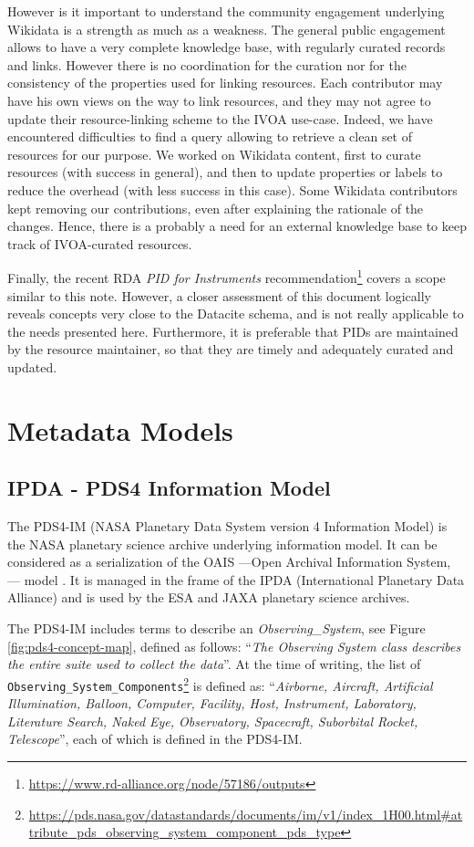 \documentclass[11pt,a4paper]{ivoa}
\begin{document}
However is it important to understand the community engagement 
underlying Wikidata is a strength as much as a weakness. The 
general public engagement allows to have a very complete  
knowledge base, with regularly curated records and links. However
there is no coordination for the curation nor for the consistency
of the properties used for linking resources. Each contributor may
have his own views on the way to link resources, and they may not 
agree to update their resource-linking scheme to the IVOA use-case.
Indeed, we have encountered difficulties to find a query allowing 
to retrieve a clean set of resources for our purpose. We worked on 
Wikidata content, first to curate resources (with success in general), 
and then to update properties or labels to reduce the overhead (with
less success in this case). Some Wikidata contributors kept removing 
our contributions, even after explaining the rationale of the changes. 
Hence, there is a probably a need for an external knowledge base to 
keep track of IVOA-curated resources.  

Finally, the recent RDA \emph{PID for Instruments} 
recommendation\footnote{\url{https://www.rd-alliance.org/node/57186/outputs}} 
covers a scope similar to this note. However, a closer 
assessment of this document logically reveals concepts very 
close to the Datacite schema, and is not really applicable to 
the needs presented here. Furthermore, it is preferable that 
PIDs are maintained by the resource maintainer, so that they 
are timely and adequately curated and updated. 

\appendix
\section{Metadata Models}
\label{appendix:models}

\subsection{IPDA - PDS4 Information Model}
The PDS4-IM (NASA Planetary Data System version 4 Information Model) 
is the NASA planetary science archive underlying information
model. It can be considered as a serialization of the OAIS ---Open 
Archival Information System, \citep{iso:oais}--- model \citep{Hughes:2017bt}.  
It is managed in the frame of the IPDA (International Planetary 
Data Alliance) and is used by the ESA and JAXA planetary science 
archives. 

The PDS4-IM includes terms to describe an \emph{Observing\_System}, see 
Figure \ref{fig:pds4-concept-map}, defined as follows:
``\emph{The Observing System class describes the entire suite used to 
collect the data}''. At the time of writing, the list of 
\texttt{Observing\_System\_Components}\footnote{
\url{https://pds.nasa.gov/datastandards/documents/im/v1/index_1H00.html\#attribute_pds_observing_system_component_pds_type}}
is defined as: ``\emph{Airborne, Aircraft, Artificial Illumination, 
Balloon, Computer, Facility, Host, Instrument, Laboratory, Literature 
Search, Naked Eye, Observatory, Spacecraft, Suborbital Rocket, 
Telescope}'', each of which is defined in the PDS4-IM. 
\end{document}
